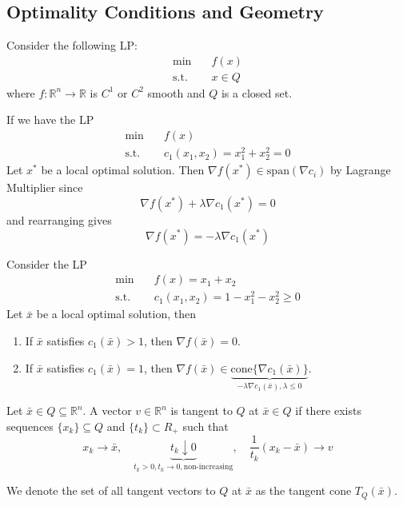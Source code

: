 \subsection{Optimality Conditions and Geometry}
Consider the following LP:
\begin{align*}
    \min \quad & f(x) \\
    \text{s.t.} \quad & x \in Q
\end{align*}
where $f: \mathbb R^n \to \mathbb R$ is $C^1$ or $C^2$ smooth and $Q$ is a closed set.
\begin{example}
    If we have the LP
    \begin{align*}
        \min \quad & f(x) \\
        \text{s.t.} \quad & c_1(x_1,x_2) = x_1^2 + x_2^2 = 0 
    \end{align*}
    Let $x^*$ be a local optimal solution. Then $\nabla f(x^*) \in \mathrm{span}(\nabla c_i)$ by Lagrange Multiplier since
    $$\nabla f(x^*) + \lambda \nabla c_1(x^*) = 0$$ and rearranging gives
    $$\nabla f(x^*) = -\lambda \nabla c_1(x^*)$$
\end{example} 
\begin{example}
    Consider the LP
    \begin{align*}
        \min \quad & f(x) = x_1 + x_2 \\
        \text{s.t.} \quad & c_1(x_1,x_2) = 1 - x_1^2 - x_2^2 \geq 0 
    \end{align*}
    Let $\bar x$ be a local optimal solution, then
    \begin{enumerate}
        \item If $\bar x$ satisfies $c_1(\bar x) > 1$, then $\nabla f(\bar x) = 0$.
        \item If $\bar x$ satisfies $c_1(\bar x) = 1$, then $\nabla f(\bar x) \in \underbrace{\mathrm{cone}\{\nabla c_1(\bar x)\}}_{-\lambda \nabla c_1(\bar x), \lambda \leq 0}$.
    \end{enumerate}
\end{example}
\begin{definition}
    Let $\bar x \in Q \subseteq \mathbb R^n$. A vector $v \in \mathbb R^n$ is tangent to $Q$ at $\bar x \in Q$ if there exists sequences $\{x_k\}\subseteq Q$ and $\{t_k\} \subset R_+$ such that $$x_k \to \bar x, \quad \underbrace{t_k \downarrow 0}_{t_k > 0, t_k \to 0, \text{non-increasing}}, \quad \frac{1}{t_k}(x_k - \bar x) \to v$$
\end{definition}
\begin{definition}
    We denote the set of all tangent vectors to $Q$ at $\bar x$ as the tangent cone $T_Q(\bar x)$.
\end{definition}